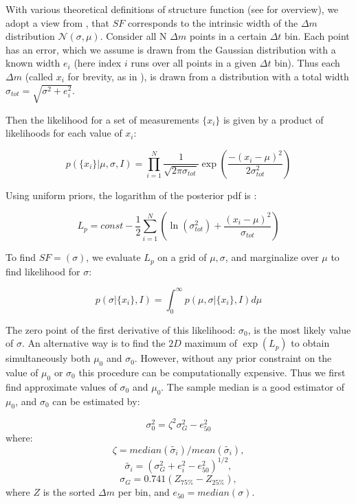 \documentclass[fleqn,usenatbib]{mnras}  %
\begin{document}
With  various theoretical definitions of structure function (see \cite{kozlowski2016} for overview), we adopt a view from \cite{ivezic2014}, that $SF$ corresponds to the intrinsic width of the $\Delta m$ distribution  $\mathcal{N}(\sigma,\mu)$. Consider all N  $\Delta m$  points in a certain $\Delta t$  bin.  Each point has an error, which we assume is drawn from the Gaussian distribution with a known width $e_{i}$ (here index $i$ runs over all points in a given $\Delta t$ bin). Thus each $\Delta m$ (called $x_{i}$ for brevity, as  in  \cite{ivezic2014}), is drawn from a distribution  with a total width $\sigma_{tot} = \sqrt{\sigma^{2} + e_{i}^{2}}$. 

Then the likelihood for a set of measurements $\{x_{i}\}$ is given by a product of likelihoods for each value of $x_{i}$:

\begin{equation}
p(\{ x_{i}\} | \mu, \sigma, I) =  \prod _{i=1}^{N} { \frac{1}{\sqrt{2\pi \sigma_{tot}}} \exp{\left( \frac{-(x_{i}-\mu)^{2}}{2\sigma_{tot}^{2}} \right)}}
\end{equation}

Using uniform priors, the logarithm of the posterior pdf is :

\begin{equation}
\label{eq:logP}
L_{p} = const - \frac{1}{2} \sum_{i=1}^{N} {\left( \ln{(\sigma_{tot}^{2})} + \frac{(x_{i}-\mu)^{2}}{\sigma_{tot}} \right) }
\end{equation}

To find $SF = (\sigma)$, we evaluate $L_{p}$ on a grid of $\mu, \sigma$, and marginalize over $\mu$ to find likelihood for $\sigma$:  

\begin{equation}
p(\sigma|\{ x_{i}\}, I) = \int_{0}^{\infty} {p(\mu,\sigma |\{ x_{i}\}, I )} d \mu
\end{equation}

The zero point of the first derivative of this likelihood: $\sigma_{0}$,  is the most likely value of $\sigma$. An alternative way is to find the $2D$ maximum of $\exp{(L_{p})}$ to obtain simultaneously both $\mu_{0}$ and $\sigma_{0}$. However, without any prior constraint on the value of $\mu_{0}$ or $\sigma_{0}$ this procedure can be  computationally expensive. Thus we first find  approximate values of  $\sigma_{0}$ and $\mu_{0}$.  The sample median is a good estimator of $\mu_{0}$, and $\sigma_{0}$ can be estimated by:

\begin{equation}
\sigma_{0}^{2} = \zeta^{2} \sigma_{G}^{2} - e_{50}^{2}
\end{equation} 
where:
\begin{equation}
\zeta = median(\tilde{\sigma_{i}}) / mean(\tilde{\sigma_{i}}),
\end{equation} 
\begin{equation}
\tilde{\sigma_{i}} = (\sigma_{G}^{2} + e_{i}^{2} - e_{50}^{2})^{1/2},
\end{equation}
\begin{equation}
\sigma_{G} = 0.741 (Z_{75\%} - Z_{25\%}), 
\end{equation}
where $Z$ is the sorted $\Delta m$ per bin, and $e_{50} = median(\sigma)$.
\end{document}
